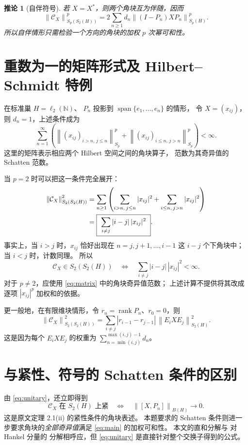 \documentclass[UTF8,11pt,a4paper,fontset=fandol]{ctexart}
\newtheorem{corollary}[theorem]{推论}
\theoremstyle{remark}
\newcommand{\CC}{\mathcal C}
\newcommand{\rank}{\operatorname{rank}}
\newcommand{\norm}[1]{\left\lVert #1\right\rVert}
\begin{document}
\begin{corollary}[自伴符号]
若 $X=X^*$，则两个角块互为伴随，因而
\[
 \norm{\CC_X}_{S_p(S_2(H))}^p
 =2\sum_{n\geq1}d_n\norm{(I-P_n)XP_n}_{S_p(H)}^p.
\]
所以自伴情形只需检验一个方向的角块的加权 $p$ 次幂可和性。
\end{corollary}

\section*{重数为一的矩阵形式及 Hilbert--Schmidt 特例}

在标准巢 $H=\ell_2(\mathbb N)$、
$P_n$ 投影到 $\operatorname{span}\{e_1,\ldots,e_n\}$ 的情形，
令 $X=(x_{ij})$，则 $d_n=1$，上述条件成为
\begin{equation}\label{eq:matrix}
 \sum_{n=1}^{\infty}\left(
  \norm{(x_{ij})_{i>n,\,j\leq n}}_{S_p}^p
  +\norm{(x_{ij})_{i\leq n,\,j>n}}_{S_p}^p
 \right)<\infty.
\end{equation}
这里的矩阵表示相应两个 Hilbert 空间之间的角块算子，
范数为其奇异值的 Schatten 范数。

当 $p=2$ 时可以把这一条件完全展开：
\begin{align}
 \norm{\CC_X}_{S_2(S_2(H))}^2
 &=\sum_{n\geq1}\left(
   \sum_{i>n,\,j\leq n}|x_{ij}|^2
   +\sum_{i\leq n,\,j>n}|x_{ij}|^2\right)\notag\\
 &=\boxed{\ \sum_{i\ne j}|i-j|\,|x_{ij}|^2\ }.\label{eq:hs}
\end{align}
事实上，当 $i>j$ 时，$x_{ij}$ 恰好出现在 $n=j,j+1,\ldots,i-1$
这 $i-j$ 个下角块中；当 $i<j$ 时，计数同理。
所以
\[
 \CC_X\in S_2(S_2(H))
 \quad\Longleftrightarrow\quad
 \sum_{i\ne j}|i-j|\,|x_{ij}|^2<\infty.
\]
对于 $p\ne2$，应使用 \eqref{eq:matrix} 中的角块奇异值范数；
上述计算不提供将其改成逐项 $|x_{ij}|^p$ 加权和的依据。

更一般地，在有限维块情形，令 $r_n=\rank P_n$、$r_0=0$，则
\begin{equation}\label{eq:blockhs}
 \norm{\CC_X}_{S_2(S_2(H))}^2
 =\sum_{i\ne j}|r_{i-1}-r_{j-1}|\,
   \norm{E_iXE_j}_{S_2(H)}^2.
\end{equation}
这是因为每个 $E_iXE_j$ 的权重为
$\sum_{n=\min(i,j)}^{\max(i,j)-1}d_n$。

\section*{与紧性、符号的 Schatten 条件的区别}

由 \eqref{eq:unitary}，还立即得到
\[
 \CC_X\text{ 在 }S_2(H)\text{ 上紧}
 \quad\Longleftrightarrow\quad
 \norm{[X,P_n]}_{B(H)}\longrightarrow0.
\]
这是原文定理 2.1(ii) 的紧性条件的角块表述。
本题要求的 Schatten 条件则进一步要求角块的\emph{全部奇异值}满足
\eqref{eq:main} 的加权可和性。
本文的直和分解与 \cite[p.~279, Remark (2)]{Power} 对 Hankel 分量的
分解相呼应，但 \eqref{eq:unitary} 是直接针对整个交换子得到的公式。
\end{document}
